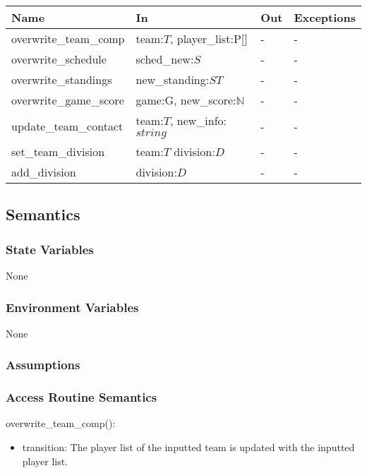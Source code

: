 \documentclass[12pt, titlepage]{article}
\begin{document}
\begin{center}
\begin{tabular}{p{5cm} p{4cm} p{4cm} p{2cm}}
\hline
\textbf{Name} & \textbf{In} & \textbf{Out} & \textbf{Exceptions} \\
\hline
overwrite\_team\_comp & team:$T$, player\_list:P[] & - & - \\
overwrite\_schedule & sched\_new:$S$ & - & - \\
overwrite\_standings & new\_standing:$ST$ & - & - \\
overwrite\_game\_score & game:G, new\_score:$\mathbb{N}$ & - & - \\
update\_team\_contact & team:$T$, new\_info:$string$ & - & - \\
set\_team\_division & team:$T$ division:$D$ & - & - \\
add\_division & division:$D$ & - & - \\

\hline
\end{tabular}
\end{center}

\subsection{Semantics}

\subsubsection{State Variables}

None

\subsubsection{Environment Variables}

None

\subsubsection{Assumptions}


\subsubsection{Access Routine Semantics}

\noindent overwrite\_team\_comp():
\begin{itemize}
\item transition: The player list of the inputted team is updated with the 
      inputted player list.
\end{itemize}
\end{document}
